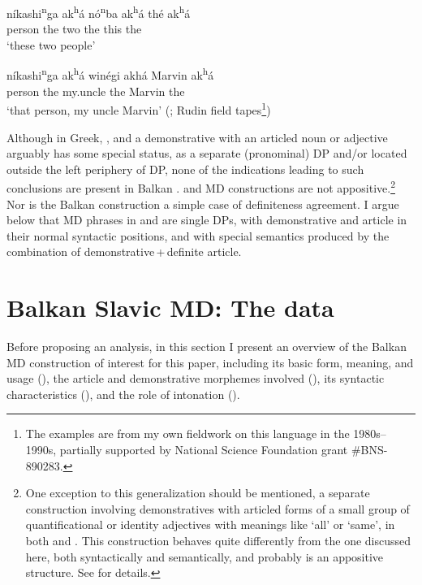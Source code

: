 \documentclass[output=paper]{langscibook}
\begin{document}
\ex \label{akha2}
\gll níkashi\textsuperscript{n}ga ak\textsuperscript{h}á nó\textsuperscript{n}ba ak\textsuperscript{h}á  thé ak\textsuperscript{h}á \\
    person the two the this the \\
\glt `these two people'

\ex \label{akha3}
\gll níkashi\textsuperscript{n}ga ak\textsuperscript{h}á winégi akhá Marvin ak\textsuperscript{h}á \\
    person the my.uncle the Marvin the \\
\glt `that person, my uncle Marvin' \hfill (; Rudin field tapes\footnote{The  examples are from my own fieldwork on this language in the 1980s--1990s, partially supported by National Science Foundation grant \#BNS-890283.})
\z
\z

\noindent Although in Greek, , and  a demonstrative with an articled noun or adjective arguably has some special status, as a separate (pronominal) DP and/or located outside the left periphery of DP, none of the indications leading to such conclusions are present in Balkan .  and  MD constructions are not appositive.\footnote{\label{qtype}One exception to this generalization should be mentioned, a separate construction involving demonstratives with articled forms of a small group of quantificational or identity adjectives with  meanings like `all' or `same', in both  and . This construction behaves quite differently from the one discussed here, both syntactically and semantically, and probably is an appositive structure. See \citet{Rudin2018} for details.}\label{Qtype} Nor is the Balkan  construction a simple case of definiteness agreement. I argue below that MD phrases in  and  are single DPs, with demonstrative and article in their normal syntactic positions, and with special semantics produced by the combination of demonstrative\,+\,definite article.
\section{Balkan Slavic MD: The data}
Before proposing an analysis, in this section I present an overview of the Balkan  MD construction of interest for this paper, including its basic form, meaning, and usage (), the article and demonstrative morphemes involved (), its syntactic characteristics (), and the role of intonation ().
\end{document}
